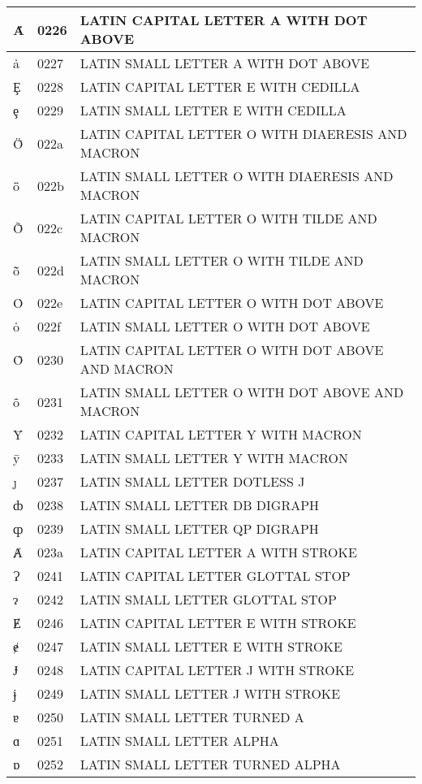 \documentclass[12pt,letterpaper,openany]{book}
\begin{document}
\begin{center}
\begin{supertabular}{|m{0.25in}|m{0.5in}|m{4in}|}
			Ȧ & 0226 & LATIN CAPITAL LETTER A WITH DOT ABOVE\\\hline
			ȧ & 0227 & LATIN SMALL LETTER A WITH DOT ABOVE\\\hline
			Ȩ & 0228 & LATIN CAPITAL LETTER E WITH CEDILLA\\\hline
			ȩ & 0229 & LATIN SMALL LETTER E WITH CEDILLA\\\hline
			Ȫ & 022a & LATIN CAPITAL LETTER O WITH DIAERESIS AND MACRON\\\hline
			ȫ & 022b & LATIN SMALL LETTER O WITH DIAERESIS AND MACRON\\\hline
			Ȭ & 022c & LATIN CAPITAL LETTER O WITH TILDE AND MACRON\\\hline
			ȭ & 022d & LATIN SMALL LETTER O WITH TILDE AND MACRON\\\hline
			Ȯ & 022e & LATIN CAPITAL LETTER O WITH DOT ABOVE\\\hline
			ȯ & 022f & LATIN SMALL LETTER O WITH DOT ABOVE\\\hline
			Ȱ & 0230 & LATIN CAPITAL LETTER O WITH DOT ABOVE AND MACRON\\\hline
			ȱ & 0231 & LATIN SMALL LETTER O WITH DOT ABOVE AND MACRON\\\hline
			Ȳ & 0232 & LATIN CAPITAL LETTER Y WITH MACRON\\\hline
			ȳ & 0233 & LATIN SMALL LETTER Y WITH MACRON\\\hline
			ȷ & 0237 & LATIN SMALL LETTER DOTLESS J\\\hline
			ȸ & 0238 & LATIN SMALL LETTER DB DIGRAPH\\\hline
			ȹ & 0239 & LATIN SMALL LETTER QP DIGRAPH\\\hline
			Ⱥ & 023a & LATIN CAPITAL LETTER A WITH STROKE\\\hline
			Ɂ & 0241 & LATIN CAPITAL LETTER GLOTTAL STOP\\\hline
			ɂ & 0242 & LATIN SMALL LETTER GLOTTAL STOP\\\hline
			Ɇ & 0246 & LATIN CAPITAL LETTER E WITH STROKE\\\hline
			ɇ & 0247 & LATIN SMALL LETTER E WITH STROKE\\\hline
			Ɉ & 0248 & LATIN CAPITAL LETTER J WITH STROKE\\\hline
			ɉ & 0249 & LATIN SMALL LETTER J WITH STROKE\\\hline
			ɐ & 0250 & LATIN SMALL LETTER TURNED A\\\hline
			ɑ & 0251 & LATIN SMALL LETTER ALPHA\\\hline
			ɒ & 0252 & LATIN SMALL LETTER TURNED ALPHA\\\hline

\end{supertabular}
\end{center}
\end{document}
